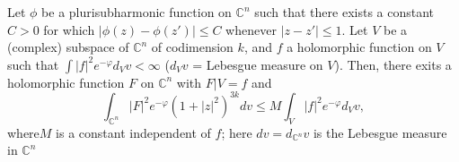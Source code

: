 \begin{prop}%
  Let $\phi$  be a plurisubharmonic function on $\mathbb{C}^n$ such 
  that there exists a constant $C > 0$ for which $|\phi(z) -
  \phi(z')|\leq C$ 
  whenever $|z-z'| \leq 1$. Let $V$ be a (complex) subspace of  $\mathbb{C}^n$ of 
  codimension $k$, and $f$ a holomorphic function on $V$ such that
  $\int |f|^2 e^{-\varphi}  d_V v < \infty$ ($d_V v$ = Lebesgue measure on
  $V$). Then, there exits a holomorphic function $F$ on $\mathbb{C}^n$
  with $F|V =f$ 
  and 
  $$ 
  \int_{\mathbb{C}^n} |F|^2 e^{-\varphi} (1+|z|^2)^{3k} dv \leqslant M \int_V |f|^2
  e^{-\varphi}d_V v,
  $$
  where\pageoriginale $M$ is a constant independent of $f$; here
  $dv=d_{\mathbb{C}^n} v$ is the Lebesgue measure in ${\mathbb{C}}^n$ 
\end{prop}

